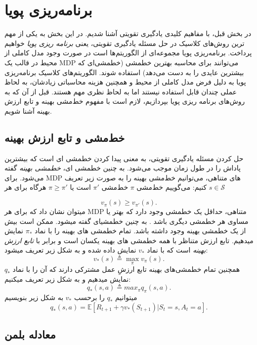 \section{برنامه‌ریزی پویا}
در بخش قبل، با مفاهیم کلیدی یادگیری تقویتی آشنا شدیم. در این بخش به یکی از مهم ترین روش‌های کلاسیک در حل مسئله یادگیری تقویتی، یعنی 
\textit{برنامه ریزی پویا}
خواهیم پرداخت. برنامه‌ریزی پویا
 مجموعه‌ای از الگوریتم‌ها است در صورت وجود مدل کاملی از محیط در قالب یک 
MDP
 می‌توانند برای محاسبه بهترین خط\nf مشی (خط\nf مشی‌ای که بیشترین عایدی را به دست می‌دهد)   استفاده شوند.
الگوریتم‌های کلاسیک برنامه‌ریزی پویا به دلیل فرض
مدل کاملی از محیط و همچنین هزینه محاسباتی زیادشان، به لحاظ عملی چندان قابل استفاده نیستند اما به لحاظ نظری مهم هستند. قبل از آن که به روش‌های برنامه ریزی پویا بپردازیم، لازم است با مفهوم خط‌مشی بهینه و تابع ارزش بهینه آشنا شویم.
\subsection{خط‌مشی و تابع ارزش بهینه}
حل کردن مسئله یادگیری تقویتی، به معنی پیدا کردن خط\nf مشی ای است که بیشترین پاداش را در طول زمان موجب می‌شود.	به چنین خط\nf مشی ای، 
\textit{خط\nf مشی بهینه} 
گفته می‌شود. برای
 MDP‌ 
 های متناهی، می‌توانیم خط‌مشی بهینه را به صورت زیر تعریف کنیم:
می‌گوییم خط‌مشی $\pi$  خط‌مشی 
$\pi'$
است یا
$\pi \ge \pi'$
هرگاه برای هر 
$s \in \mathcal{S}$

$$v_\pi(s) \ge v_{\pi'}(s).$$
 می\nf توان نشان داد که برای هر MDP متناهی، حداقل یک خط\nf مشی وجود دارد که بهتر یا مساوی هر خط\nf مشی دیگری باشد
\cite{suttonbook}.
 به چنین خط\nf مشی\nf ای  گفته می\nf  شود. ممکن است بیش از یک خط\nf مشی بهینه وجود داشته باشد. تمام خط\nf مشی\nf‌ های بهینه را با نماد $\pi_*$  نمایش می\nf دهیم. تابع ارزش متناظر با همه خط\nf مشی\nf‌ های بهینه یکسان است و برابر با 
\textit{تابع ارزش بهینه}
 است که با نماد $v_*$ نمایش داده شده و به شکل زیر تعریف می\nf شود:
$$v_*(s) \triangleq \max_{\pi} v_\pi(s).$$
همچنین تمام خط\nf مشی\nf ‌های بهینه تابع ارزشِ عمل مشترکی دارند که آن را با نماد $q_*$ نمایش می\nf دهیم و به شکل زیر تعریف می\nf کنیم:
$$q_*(s,a) \triangleq max_{\pi} q_\pi(s,a).$$
می\nf توانیم $q_*$ را برحسب $v_*$ به شکل زیر بنویسیم
\begin{equation}
q_* (s,a) = \mathbb{E}[R_{t+1} + \gamma v_*(S_{t+1})| S_t=s, A_t=a].
\end{equation}

\subsection{معادله بلمن}

